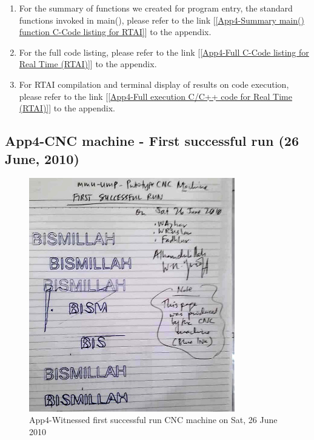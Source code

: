 \begin{enumerate}
	\item For the summary of functions we created for program entry, the standard functions invoked in  main(), please refer to the link [\ref{App4-Summary main() function C-Code listing for RTAI}] to the appendix. 

	\item For the full code listing, please refer to the link [\ref{App4-Full C-Code listing for Real Time (RTAI)}] to the appendix. 

	\item For RTAI compilation and terminal display of results on code execution, please refer to the link [\ref{App4-Full execution C/C++ code for Real Time (RTAI)}] to the appendix. 
\end{enumerate}

\pagebreak
\subsection{App4-CNC machine - First successful run (26 June, 2010)}

\begin{figure}[htbp]
	\begin{center}
	\includegraphics[width=0.80\textwidth]{./07-images/img-Ch4App/CNC-Research-machine-first-successful-run.jpg}
		\caption{App4-Witnessed first successful run CNC machine on Sat, 26 June 2010}
		\label{fig:App4-CNC-Research-machine-first-successful-run.jpg}
	\end{center}
\end{figure}

